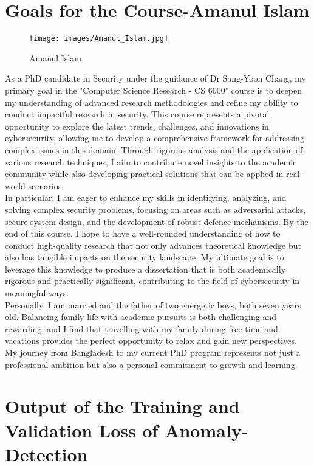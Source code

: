 \section{Goals for the Course-Amanul Islam}

\begin{figure}[h!]
\centering
\texttt{[image: images/Amanul\_Islam.jpg]}
\caption{Amanul Islam}
\label{fig:myphoto}
\end{figure}

As a PhD candidate in Security under the guidance of Dr Sang-Yoon Chang, my primary goal in the "Computer Science Research - CS 6000" course is to deepen my understanding of advanced research methodologies and refine my ability to conduct impactful research in security. This course represents a pivotal opportunity to explore the latest trends, challenges, and innovations in cybersecurity, allowing me to develop a comprehensive framework for addressing complex issues in this domain. Through rigorous analysis and the application of various research techniques, I aim to contribute novel insights to the academic community while also developing practical solutions that can be applied in real-world scenarios.\\

In particular, I am eager to enhance my skills in identifying, analyzing, and solving complex security problems, focusing on areas such as adversarial attacks, secure system design, and the development of robust defence mechanisms. By the end of this course, I hope to have a well-rounded understanding of how to conduct high-quality research that not only advances theoretical knowledge but also has tangible impacts on the security landscape. My ultimate goal is to leverage this knowledge to produce a dissertation that is both academically rigorous and practically significant, contributing to the field of cybersecurity in meaningful ways.\\

Personally, I am married and the father of two energetic boys, both seven years old. Balancing family life with academic pursuits is both challenging and rewarding, and I find that travelling with my family during free time and vacations provides the perfect opportunity to relax and gain new perspectives. My journey from Bangladesh to my current PhD program represents not just a professional ambition but also a personal commitment to growth and learning.


\section*{Output of the Training and Validation Loss of Anomaly-Detection }

